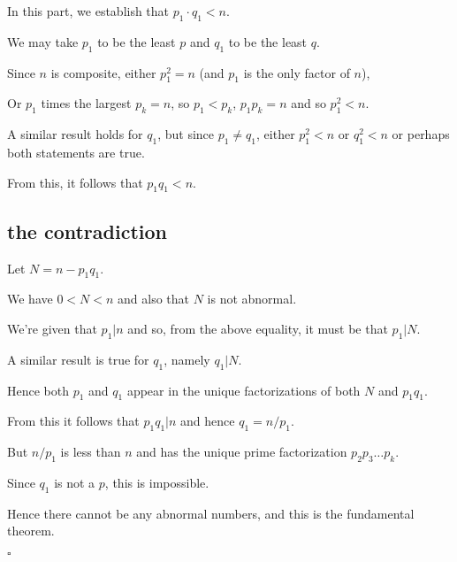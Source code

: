 \documentclass[11pt, oneside]{article}
\begin{document}
In this part, we establish that $p_1 \cdot q_1 < n$.

We may take $p_1$ to be the least $p$ and $q_1$ to be the least $q$.  

Since $n$ is composite, either $p_1^2 = n$ (and $p_1$ is the only factor of $n$),

Or $p_1$ times the largest $p_k = n$, so $p_1 < p_k$, $p_1 p_k = n$ and so $p_1^2 < n$.

A similar result holds for $q_1$, but since $p_1 \ne q_1$, either $p_1^2 < n$ or $q_1^2 < n$ or perhaps both statements are true.

From this, it follows that $p_1 q_1 < n$. 

\subsection*{the contradiction} 

Let $N = n - p_1 q_1$.

We have $0 < N < n$ and also that $N$ is not abnormal.

We're given that $p_1 | n$ and so, from the above equality, it must be that $p_1 | N$.

A similar result is true for $q_1$, namely $q_1 | N$.  

Hence both $p_1$ and $q_1$ appear in the unique factorizations of both $N$ and $p_1 q_1$.

From this it follows that $p_1 q_1 | n$ and hence $q_1 = n/p_1$.  

But $n/p_1$ is less than $n$ and has the unique prime factorization $p_2 p_3 \dots p_k$.

Since $q_1$ is not a $p$, this is impossible.  

Hence there cannot be any abnormal numbers, and this is the fundamental theorem.

$\square$
\end{document}
